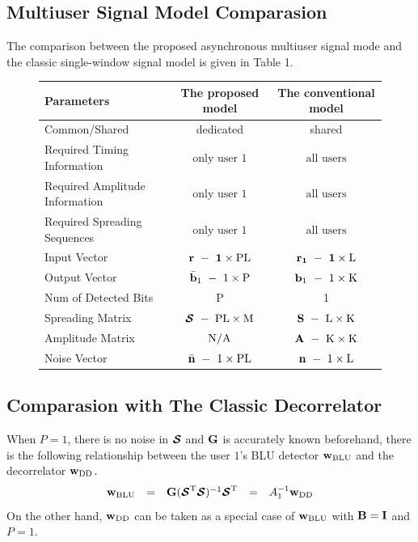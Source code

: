 \documentclass[a4paper,10pt,fleqn, twocolumn]{IEEETran}
\newcommand{\bb}{{\bf b}}
\newcommand{\bG}{{\bf G}}
\newcommand{\bn}{{\bf n}}
\newcommand{\bw}{{\bf w}}
\newcommand{\bS}{{\bf S}}
\newcommand{\bI}{{\bf I}}
\newcommand{\bB}{{\bf B}}
\newcommand{\bcS}{{\mbox {\boldmath ${\cal S}$}}}
\begin{document}
\subsection{Multiuser Signal Model Comparasion}
The comparison between the proposed asynchronous multiuser signal
mode and the classic single-window signal model is given in Table
1.
\begin{figure}[t]\label{ModelComp}
\begin{center}
\begin{tabular}{lcc}
Parameters&The proposed model&The conventional model\\
\hline
Common/Shared& dedicated& shared\\
Required Timing Information&$\mbox{only user 1}$ & $\mbox{all users}$\\
Required Amplitude Information&$\mbox{only user 1}$ & $\mbox{all users}$\\
Required Spreading Sequences&$\mbox{only user 1}$ & $\mbox{all users}$\\
\hline
Input Vector&$\bf{r}\ -\ 1\times\rm PL$&$\bf{r}_1\ -\ 1\times\rm L$\\
Output Vector &$\bar\bb_1\ -\ 1\times\rm P$&$\bb_1\ -\ 1\times\rm K$\\
Num of Detected Bits& P & 1\\
Spreading Matrix &$\bcS\ -\ \rm PL\times\rm M$&$\bS\ -\ \rm L\times\rm K$\\
Amplitude Matrix &$\rm N/A$&$\bf{A}\ -\ \rm K\times\rm K$\\
Noise Vector &$\bar\bn\ -\ 1\times\rm PL$&$\bn\ -\
1\times\rm L$\\
\hline
\end{tabular}
\end{center}
\end{figure}
\subsection{Comparasion with The Classic Decorrelator}
When $P=1$, there is no noise in $\bcS$ and $\bG$ is accurately
known beforehand, there is the following relationship between the
user $1$'s BLU detector $\bw_{\rm BLU}$ and the decorrelator
$\bw_{\rm DD}$.
\begin{equation}
\begin{array}{rcccl}
\bw_{\rm BLU}&=&\bG(\bcS^{\rm T}\bcS)^{-1}\bcS^{\rm
T}&=&A_1^{-1}\bw_{\rm DD}
\end{array}
\end{equation} \label{wN0}
\noindent On the other hand, $\bw_{\rm DD}$ can be taken as a
special case of $\bw_{\rm BLU}$ with $\bB =\bI$ and $P=1$.
\end{document}
